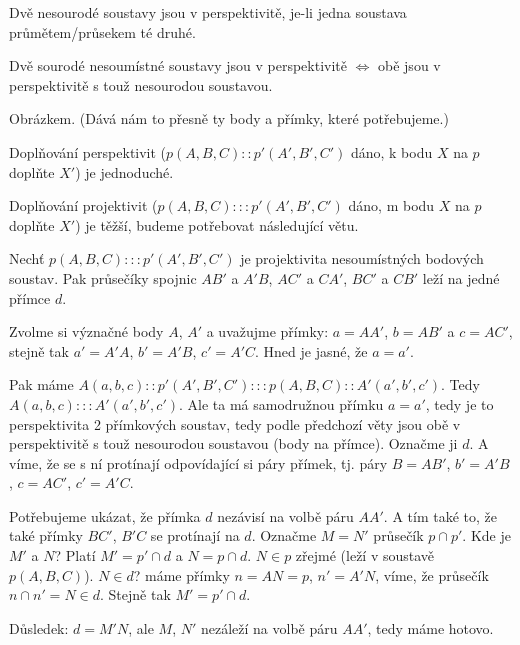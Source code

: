 \documentclass[12pt]{article}					%
\begin{document}
\begin{definice}
	Dvě nesourodé soustavy jsou v perspektivitě, je-li jedna soustava průmětem/průsekem té druhé.
\end{definice}

\begin{veta}
	Dvě sourodé nesoumístné soustavy jsou v perspektivitě $\Leftrightarrow$ obě jsou v perspektivitě s touž nesourodou soustavou.

	\begin{dukazin}
		Obrázkem. (Dává nám to přesně ty body a přímky, které potřebujeme.)
	\end{dukazin}
\end{veta}

\begin{poznamka}
	Doplňování perspektivit ($p(A, B, C)::p'(A', B', C')$ dáno, k bodu $X$ na $p$ doplňte $X'$) je jednoduché.

	Doplňování projektivit ($p(A, B, C):::p'(A', B', C')$ dáno, m bodu $X$ na $p$ doplňte $X'$) je těžší, budeme potřebovat následující větu.
\end{poznamka}

\begin{veta}
	Nechť $p(A, B, C) ::: p'(A', B', C')$ je projektivita nesoumístných bodových soustav. Pak průsečíky spojnic $AB'$ a $A'B$, $AC'$ a $CA'$, $BC'$ a $CB'$ leží na jedné přímce $d$.

	\begin{dukazin}
		Zvolme si význačné body $A$, $A'$ a uvažujme přímky: $a = AA'$, $b = AB'$ a $c = AC'$, stejně tak $a' = A'A$, $b' = A'B$, $c' = A'C$. Hned je jasné, že $a = a'$.

		Pak máme $A(a, b, c)::p'(A', B', C'):::p(A, B, C)::A'(a', b', c')$. Tedy $A(a, b, c):::A'(a', b', c')$. Ale ta má samodružnou přímku $a = a'$, tedy je to perspektivita 2 přímkových soustav, tedy podle předchozí věty jsou obě v perspektivitě s touž nesourodou soustavou (body na přímce). Označme ji $d$. A víme, že se s ní protínají odpovídající si páry přímek, tj. páry $B = AB'$, $b' = A'B$, $c = AC'$, $c' = A'C$.

		Potřebujeme ukázat, že přímka $d$ nezávisí na volbě páru $AA'$. A tím také to, že také přímky $BC'$, $B'C$ se protínají na $d$. Označme $M = N'$ průsečík $p \cap p'$. Kde je $M'$ a $N$? Platí $M' = p' \cap d$ a $N = p \cap d$. $N \in p$ zřejmé (leží v soustavě $p(A, B, C)$). $N \in d$? máme přímky $n = AN = p$, $n' = A'N$, víme, že průsečík $n \cap n' = N \in d$. Stejně tak $M' = p' \cap d$.

		Důsledek: $d = M'N$, ale $M$, $N'$ nezáleží na volbě páru $AA'$, tedy máme hotovo.
	\end{dukazin}
\end{veta}
\end{document}
